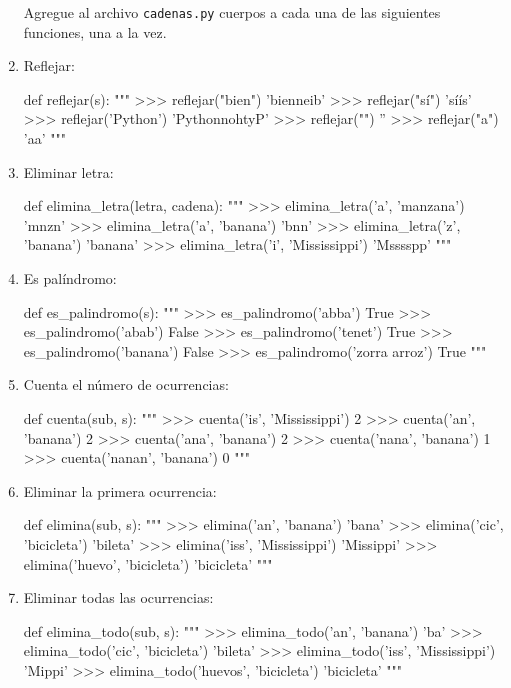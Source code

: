 \begin{enumerate}
Agregue al archivo \verb+cadenas.py+ cuerpos a cada una de las siguientes
funciones, una a la vez.
\item Reflejar:
\begin{pythoncode}
  def reflejar(s):
    """
      >>> reflejar("bien")
      'bienneib'
      >>> reflejar("sí")
      'síís'
      >>> reflejar('Python')
      'PythonnohtyP'
      >>> reflejar("")
      ''
      >>> reflejar("a")
      'aa'
    """
\end{pythoncode}
\item Eliminar letra:
\begin{pythoncode}
  def elimina_letra(letra, cadena):
    """
      >>> elimina_letra('a', 'manzana')
      'mnzn'
      >>> elimina_letra('a', 'banana')
      'bnn'
      >>> elimina_letra('z', 'banana')
      'banana'
      >>> elimina_letra('i', 'Mississippi')
      'Msssspp'
    """
\end{pythoncode}
\item Es palíndromo:
\begin{pythoncode}
  def es_palindromo(s):
    """
      >>> es_palindromo('abba')
      True
      >>> es_palindromo('abab')
      False
      >>> es_palindromo('tenet')
      True
      >>> es_palindromo('banana')
      False
      >>> es_palindromo('zorra arroz')
      True
    """
\end{pythoncode}
\item Cuenta el número de ocurrencias:
\begin{pythoncode}
  def cuenta(sub, s):
    """
      >>> cuenta('is', 'Mississippi')
      2
      >>> cuenta('an', 'banana')
      2
      >>> cuenta('ana', 'banana')
      2
      >>> cuenta('nana', 'banana')
      1
      >>> cuenta('nanan', 'banana')
      0
    """
\end{pythoncode}
\item Eliminar la primera ocurrencia: 
\begin{pythoncode}
  def elimina(sub, s):
    """
      >>> elimina('an', 'banana')
      'bana'
      >>> elimina('cic', 'bicicleta')
      'bileta'
      >>> elimina('iss', 'Mississippi')
      'Missippi'
      >>> elimina('huevo', 'bicicleta')
      'bicicleta'
    """
\end{pythoncode}
\item Eliminar todas las ocurrencias:
\begin{pythoncode}
  def elimina_todo(sub, s):
    """
      >>> elimina_todo('an', 'banana')
      'ba'
      >>> elimina_todo('cic', 'bicicleta')
      'bileta'
      >>> elimina_todo('iss', 'Mississippi')
      'Mippi'
      >>> elimina_todo('huevos', 'bicicleta')
      'bicicleta'
    """
\end{pythoncode}
\end{enumerate}

